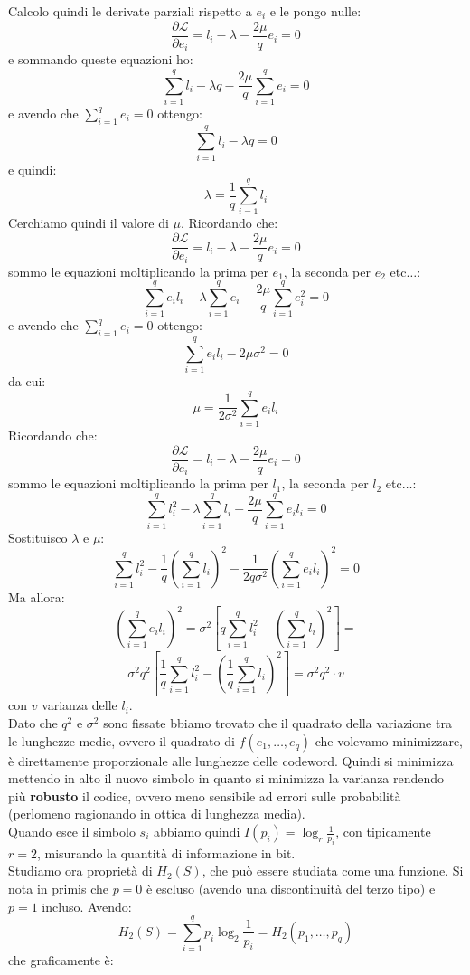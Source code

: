 \documentclass[a4paper,12pt, oneside]{book}
\begin{document}
Calcolo quindi le derivate parziali rispetto a $e_i$ e le pongo nulle:
\[\frac{\partial\mathcal{L}}{\partial e_i}=l_i-\lambda-\frac{2\mu}{q}e_i=0\]
e sommando queste equazioni ho:
\[\sum_{i=1}^q l_i-\lambda q-\frac{2\mu}{q}\sum_{i=1}^q e_i=0\]
e avendo che $\sum_{i=1}^qe_i=0$ ottengo:
\[\sum_{i=1}^q l_i-\lambda q=0\]
e quindi:
\[\lambda=\frac{1}{q}\sum_{i=1}^q l_i\]
Cerchiamo quindi il valore di $\mu$.
Ricordando che:
\[\frac{\partial\mathcal{L}}{\partial e_i}=l_i-\lambda-\frac{2\mu}{q}e_i=0\]
sommo le equazioni moltiplicando la prima per $e_1$, la seconda per $e_2 $
etc$\ldots$:
\[\sum_{i=1}^q e_il_i-\lambda \sum_{i=1}^q e_i-\frac{2\mu}{q}\sum_{i=1}^q e_i^2=0\]
e avendo che $\sum_{i=1}^qe_i=0$ ottengo:
\[\sum_{i=1}^q e_il_i-2\mu\sigma^2=0\]
da cui:
\[\mu=\frac{1}{2\sigma^2}\sum_{i=1}^qe_il_i\]
Ricordando che:
\[\frac{\partial\mathcal{L}}{\partial e_i}=l_i-\lambda-\frac{2\mu}{q}e_i=0\]
sommo le equazioni moltiplicando la prima per $l_1$, la seconda per $l_2 $
etc$\ldots$:
\[\sum_{i=1}^q l_i^2-\lambda \sum_{i=1}^q l_i-\frac{2\mu}{q}\sum_{i=1}^q
  e_il_i=0\]
Sostituisco $\lambda$ e $\mu$:
\[\sum_{i=1}^q l_i^2- \frac{1}{q}\left(\sum_{i=1}^q l_i\right)^2-
  \frac{1}{2q\sigma^2}\left(\sum_{i=1}^qe_il_i\right)^2=0\]
Ma allora:
\[\left(\sum_{i=1}^qe_il_i\right)^2=\sigma^2\left[q\sum_{i=1}^q
    l_i^2-\left(\sum_{i=1}^q
      l_i\right)^2\right]=\]
\[\sigma^2q^2\left[\frac{1}{q}\sum_{i=1}^q
    l_i^2-\left(\frac{1}{q}\sum_{i=1}^q l_i\right)^2\right]=\sigma^2q^2\cdot v\]
con $v$ varianza delle $l_i$.\\
Dato che $q^2$ e $\sigma^2$ sono fissate bbiamo trovato che il quadrato della
variazione tra le lunghezze medie, ovvero il quadrato di $f(e_1,\ldots,e_q)$ che
volevamo minimizzare, è direttamente proporzionale alle lunghezze delle
codeword. Quindi si minimizza mettendo in alto il nuovo simbolo in quanto si
minimizza la varianza rendendo più \textbf{robusto} il codice, ovvero meno
sensibile ad errori sulle probabilità (perlomeno ragionando in ottica di
lunghezza media).\\
Quando esce il simbolo $s_i$ abbiamo quindi $I(p_i)=\log_r \frac{1}{p_i}$, con
tipicamente $r=2$, misurando la quantità di informazione in bit.\\
Studiamo ora proprietà di $H_2(S)$, che può essere studiata come una
funzione. Si nota in primis che $p=0$ è escluso (avendo una discontinuità del
terzo tipo) e $p=1$ incluso. Avendo:
\[H_2(S)=\sum_{i=1}^q p_i\log_2\frac{1}{p_i}=H_2(p_1,\ldots, p_q)\]
che graficamente è:
\begin{figure}[H]
  \centering
\end{figure}
\end{document}
